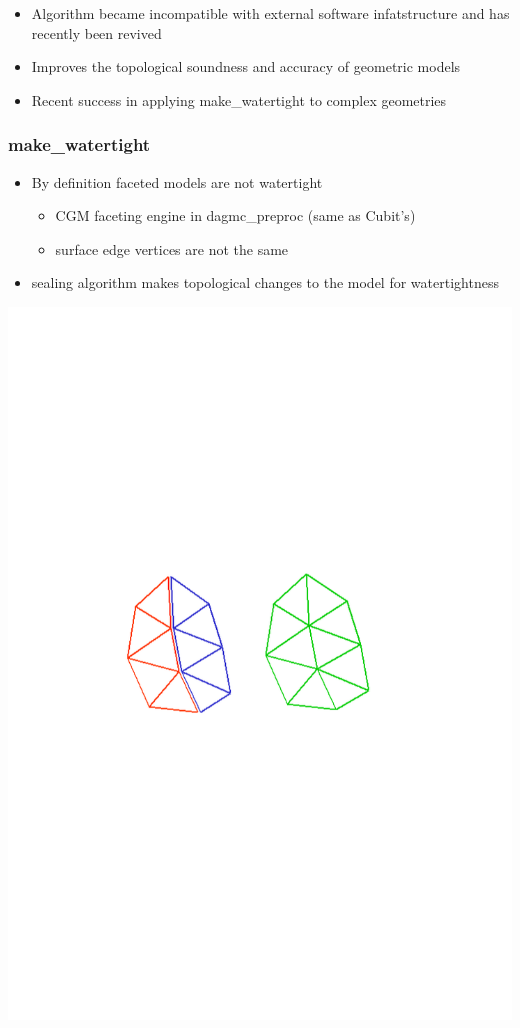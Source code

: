 \documentclass[14pt]{beamer}
\begin{document}
\begin{frame}
\begin{itemize}
\frametitle{make\_watertight}
\item Algorithm became incompatible with external software infatstructure and has recently been revived
\item Improves the topological soundness and accuracy of geometric models
\item Recent success in applying make\_watertight to complex geometries
\end{itemize}
\end{frame}

\begin{frame}
\frametitle{make\_watertight}

\begin{itemize}
\vfill
\item By definition faceted models are not watertight
	\begin{itemize}
	\item CGM faceting engine in dagmc\_preproc (same as Cubit's)
	\item surface edge vertices are not the same
	\end{itemize}
\vfill
\item sealing algorithm makes topological changes to the model for watertightness

\end{itemize}
\includegraphics[scale=0.45, trim = -100 0 0 250 ]{stitch00.png}
\end{frame}
\end{document}
